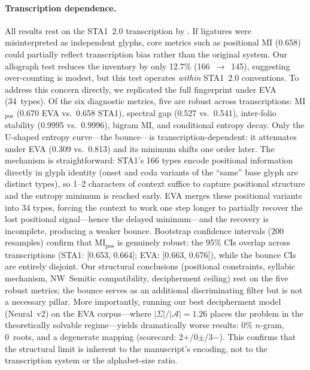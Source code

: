\paragraph{Transcription dependence.}
All results rest on the STA1~2.0 transcription by \citet{zandbergen2022}.  If ligatures were misinterpreted as independent glyphs, core metrics such as positional MI (0.658) could partially reflect transcription bias rather than the original system.  Our allograph test reduces the inventory by only 12.7\% (166~$\to$~145), suggesting over-counting is modest, but this test operates \emph{within} STA1~2.0 conventions.  To address this concern directly, we replicated the full fingerprint under EVA (34~types).  Of the six diagnostic metrics, five are robust across transcriptions: MI$_{\text{pos}}$ (0.670 EVA vs.\ 0.658 STA1), spectral gap (0.527 vs.\ 0.541), inter-folio stability (0.9995 vs.\ 0.9996), bigram MI, and conditional entropy decay.  Only the U-shaped entropy curve---the bounce---is transcription-dependent: it attenuates under EVA (0.309 vs.\ 0.813) and its minimum shifts one order later.  The mechanism is straightforward: STA1's 166 types encode positional information directly in glyph identity (onset and coda variants of the ``same'' base glyph are distinct types), so 1--2 characters of context suffice to capture positional structure and the entropy minimum is reached early.  EVA merges these positional variants into 34 types, forcing the context to work one step longer to partially recover the lost positional signal---hence the delayed minimum---and the recovery is incomplete, producing a weaker bounce.  Bootstrap confidence intervals (200 resamples) confirm that MI$_{\text{pos}}$ is genuinely robust: the 95\% CIs overlap across transcriptions (STA1: [0.653, 0.664]; EVA: [0.663, 0.676]), while the bounce CIs are entirely disjoint.  Our structural conclusions (positional constraints, syllabic mechanism, NW~Semitic compatibility, decipherment ceiling) rest on the five robust metrics; the bounce serves as an additional discriminating filter but is not a necessary pillar.  More importantly, running our best decipherment model (Neural~v2) on the EVA corpus---where $|\Sigma|/|\mathcal{A}|=1.26$ places the problem in the theoretically solvable regime---yields dramatically worse results: 0\% $n$-gram, 0~roots, and a degenerate mapping (scorecard: 2+/0$\pm$/3$-$).  This confirms that the structural limit is inherent to the manuscript's encoding, not to the transcription system or the alphabet-size ratio.

